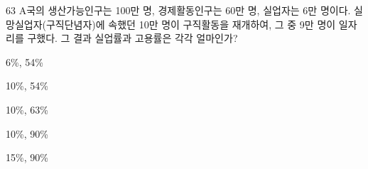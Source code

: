 \begin{question}{63}
A국의 생산가능인구는 100만 명, 경제활동인구는 60만 명, 실업자는 6만 명이다. 실망실업자(구직단념자)에 속했던 10만 명이 구직활동을 재개하여, 그 중 9만 명이 일자리를 구했다. 그 결과 실업률과 고용률은 각각 얼마인가?
\begin{choices}
  \item 6\%, 54\%
  \item 10\%, 54\%
  \item 10\%, 63\%
  \item 10\%, 90\%
  \item 15\%, 90\%
\end{choices}
\end{question}
